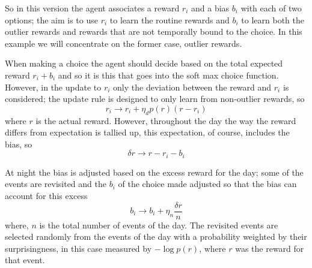 \documentclass[12pt,a4paper]{scrartcl}
\begin{document}
So in this version the agent associates a reward $r_i$ and a bias
$b_i$ with each of two options; the aim is to use $r_i$ to learn the
routine rewards and $b_i$ to learn both the outlier rewards and
rewards that are not temporally bound to the choice. In this example we will
concentrate on the former case, outlier rewards.

When making a choice the agent should decide based on the total
expected reward $r_i+b_i$ and so it is this that goes into the soft
max choice function. However, in the update to $r_i$ only the
deviation between the reward and $r_i$ is considered; the update rule
is designed to only learn from non-outlier rewards, so
\begin{equation}
  r_i\rightarrow r_i+\eta_d p(r)(r-r_i)
\end{equation}
where $r$ is the actual reward.  However, throughout the day the way
the reward differs from expectation is tallied up, this expectation,
of course, includes the bias, so
\begin{equation}
  \delta r\rightarrow r-r_i-b_i
\end{equation}

At night the bias is adjusted based on the excess reward for the day;
some of the events are revisited and the $b_i$ of the choice made
adjusted so that the bias can account for this excess
\begin{equation}
  b_i\rightarrow b_i+\eta_n \frac{\delta r}{n}
\end{equation}
where, $n$ is the total number of events of the day. The revisited
events are selected randomly from the events of the day with a
probability weighted by their surprisingness, in this case measured by
$-\log{p(r)}$, where $r$ was the reward for that event.
\end{document}
